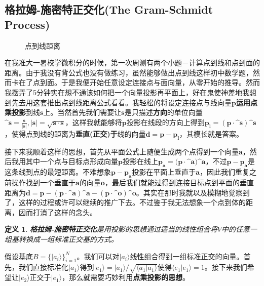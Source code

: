 \documentclass[mathserif,hyperref,UTF8,openany,b5paper]{ctexbook}
\newtheorem{defn}{定义}[section]
\begin{document}
\subsection{格拉姆-施密特正交化(The Gram-Schmidt Process)}
\begin{figure}
\caption{点到线距离}
\end{figure}
在我准大一暑校学微积分的时候，第一次周测有两个小题－计算点到线和点到面的距离。由于我没有背公式也没有做练习，虽然能够做出点到线这样初中数学题，然而卡在了点到面。于是我便开始任意设定连接点与面向量，从零开始的推导。然而我摆弄了5分钟实在想不通该如何把一个向量投影再平面上，好在鬼使神差地我想到先去用这套推出点到线距离公式看看。我轻松的将设定连接点与线向量$\mathbf{p}$\textbf{运用点乘投影}到线$\mathbf{s}$上。当然首先我们需要让$\mathbf{s}$是只描述\textbf{方向}的单位向量$\mathbf{\^{s}=\frac{s}{|s|},|s|=\sqrt{\mathbf{s}\cdot\mathbf{s}}}$，这样我就能够将$\mathbf{p}$投影在线段的方向上得到$\mathbf{p_l}=(\mathbf{p}\cdot \mathbf{\^{s}})\mathbf{\^{s}}$，使得点到线的距离为\textbf{垂直(正交)于}线的向量$\mathbf{d}=\mathbf{p}-\mathbf{p_l}$，其模长就是答案。

接下来我顺着这样的思想，首先从平面公式上随便生成两个点得到一个向量$\mathbf{a}$，然后我用其中一个点与目标点形成向量$\mathbf{p}$投影在线上$\mathbf{p_a}=(\mathbf{p}\cdot\mathbf{\^{a})\^{a}}$，不过$\mathbf{p-p_a}$是这条线到点的最短距离。不难想象$\mathbf{p-p_a}$投影在平面上垂直于$\mathbf{a}$，因此我们重复之前操作找到一个垂直于$\mathbf{a}$的向量$\mathbf{o}$，最后我们就能过得到连接目标点到平面的垂直距离为$\mathbf{d}=\mathbf{p-(p\cdot\^{a})\^{a}-(p\cdot\^{o})\^{o}}$。其实在那时我就以及模糊地觉察到了，这样的过程或许可以继续的推广下去。不过鉴于我无法想象一个点到体的距离，因而打消了这样的念头。
\begin{defn}
\textbf{格拉姆-施密特正交化}是用投影的思想通过适当的线性组合将$V$中的任意一组基转换成一组标准正交基的方式。
\end{defn}
假设基底$B=\{|a_i\rangle\}^N_{i=1}$。我们可以对$|a_i\rangle$线性组合得到一组标准正交的向量。首先，我们直接标准化$|a_1\rangle$得到$|e_1\rangle=|a_1\rangle/\sqrt{\langle a_1|a_1\rangle}$使得$\langle e_1|e_1\rangle=1$。接下来我们希望让$|e_2\rangle$正交于$|e_1\rangle$，那么就需要巧妙利用\textbf{点乘投影的思想}。
\end{document}
